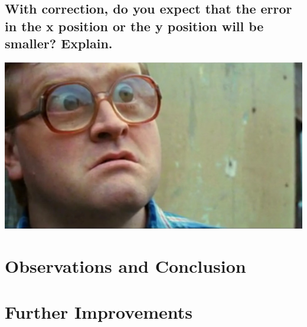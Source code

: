 \documentclass[11pt]{article} %
\begin{document}
\subsection{With correction, do you expect that the error in the x position or the y position will
be smaller? Explain.}
\includegraphics{Bubbles.png}
\section{Observations and Conclusion}

\section{Further Improvements}
\end{document}
